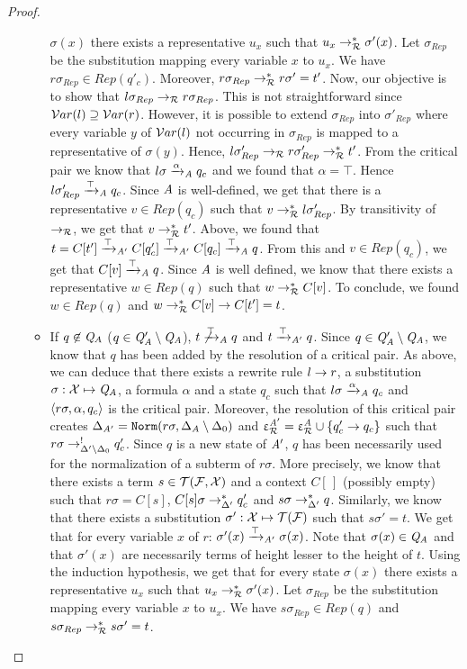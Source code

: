 \begin{proof}
\begin{enumerate}
\begin{itemize}
$\sigma(x)$ there exists a representative $u_x$ such that $u_x \rightarrow_\mathcal R^*
\sigma'(x)$. Let $\sigma_{Rep}$ be the substitution mapping every variable $x$
to $u_x$. We have $r\sigma_{Rep} \in Rep(q'_c)$. Moreover, $r\sigma_{Rep} \rightarrow_\mathcal R^*
r\sigma'=t'$. Now, our objective is to show that $l\sigma_{Rep} \rightarrow_\mathcal R
r\sigma_{Rep}$. This is not straightforward since $\mathcal{ V}ar(l)\supseteq \mathcal{ V}ar(r)$.
However, it is possible to extend $\sigma_{Rep}$ into $\sigma'_{Rep}$ where every
variable $y$ of $\mathcal{ V}ar(l)$ not occurring in $\sigma_{Rep}$ is mapped to a
representative of $\sigma(y)$. Hence, $l \sigma'_{Rep} \rightarrow_\mathcal R r\sigma'_{Rep}
\rightarrow_\mathcal R^* t'$. From the critical pair we know that $l\sigma \xrightarrow{\alpha}_\mathit A q_c$ and
we found that $\alpha=\top$. Hence $l\sigma'_{Rep} \xrightarrow{\top}_\mathit A q_c$. Since $\mathit A$ is
well-defined, we get that there is a representative $v \in Rep(q_c)$ such that
$v \rightarrow_\mathcal R^* l\sigma'_{Rep}$. By transitivity of $\rightarrow_\mathcal R$, we get that $v \rightarrow_\mathcal R^* t'$.
Above, we found that $t=C[t'] \xrightarrow{\top}_{\mathit A'} C[q'_c] \xrightarrow{\top}_{\mathit A'} C[q_c] \xrightarrow{\top}_\mathit A q$. From this
and $v\in Rep(q_c)$, we get that $C[v] \xrightarrow{\top}_\mathit A q$. Since $\mathit A$ is well defined, we
know that there exists a representative $w\in Rep(q)$ such that $w\rightarrow_\mathcal R^* C[v]$.
To conclude, we found $w\in Rep(q)$ and $w \rightarrow_\mathcal R^* C[v] \rightarrow C[t']=t$.

\item If $q \not \in \mathit Q_A$ ($q\in\mathit Q'_\mathit A\setminus \mathit Q_\mathit A$), $t \not\xrightarrow{\top}_\mathit A q$ and $t
  \xrightarrow{\top}_{\mathit A'} q$. Since $q\in \mathit Q'_\mathit A\setminus \mathit Q_\mathit A$, we know that $q$ has been added
  by the resolution of a critical pair. As above, we can deduce that there
  exists a rewrite rule $l \rightarrow r$, a substitution $\sigma:\mathcal X \mapsto \mathit Q_\mathit A$, a
  formula $\alpha$ and a state $q_c$ such that $l\sigma \xrightarrow{\alpha}_\mathit A q_c$ and
  $\langle r\sigma, \alpha, q_c\rangle$ is the critical pair. Moreover, the resolution
  of this critical pair creates $\Delta_{\mathit A'}=\mathtt{Norm}(r\sigma,\Delta_\mathit A\setminus
  \Delta_0)$ and $\upvarepsilon_{\mathcal R}^{\mathit A'}=\upvarepsilon_{\mathcal R}^{\mathit A} \cup \{q'_c \rightarrow q_c\}$ such that $r\sigma
  \rightarrow^!_{\Delta'\setminus\Delta_0} q'_c$. Since $q$ is a new state of $\mathit A'$, $q$
  has been necessarily used for the normalization of a subterm of
  $r\sigma$. More precisely, we know that there exists a term $s\in\mathcal{T(F, X)}$ and a
  context $C[\,]$ (possibly empty) such that $r\sigma=C[s]$, $C[s]\sigma \rightarrow_{\Delta'}^* q'_c$
  and $s\sigma \rightarrow^*_{\Delta'} q$. Similarly, we know that there exists a
  substitution $\sigma':\mathcal X \mapsto \mathcal{T(F)}$ such that $s\sigma'=t$.
  We get that for every variable $x$ of $r$: $\sigma'(x) \xrightarrow{\top}_{\mathit A'} \sigma(x)$.
  Note that $\sigma(x)\in\mathit Q_\mathit A$ and that $\sigma'(x)$ are necessarily terms of
  height lesser to the height of $t$. Using the induction hypothesis, we get
  that for every state $\sigma(x)$ there exists a representative $u_x$ such that
  $u_x \rightarrow_\mathcal R^* \sigma'(x)$. Let $\sigma_{Rep}$ be the substitution mapping every
  variable $x$ to $u_x$. We have $s\sigma_{Rep} \in Rep(q)$ and $s\sigma_{Rep}
  \rightarrow_\mathcal R^* s\sigma'=t$.
\end{itemize}



\end{enumerate}
\end{proof}
